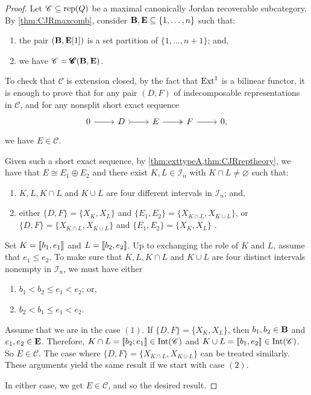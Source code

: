 \begin{proof}
    Let $\mathscr{C} \subseteq \operatorname{rep}(Q)$ be a maximal canonically Jordan recoverable subcategory. By \cref{thm:CJRmaxcomb}, consider $\mathbf B,\mathbf E \subseteq \{1, \ldots,n\}$ such that:
    \begin{enumerate}[label=$\bullet$,itemsep=1mm]
        \item the pair $(\mathbf B,\mathbf E[1])$ is a set partition of $\{1,\ldots,n+1\}$; and, 
        \item we have $\mathscr{C} = \operatorname{\pmb{\mathscr{C}}}(\mathbf B,\mathbf E)$.
    \end{enumerate} To check that $\mathscr{C}$ is extension closed, by the fact that $\operatorname{Ext}^1$ is a bilinear functor, it is enough to prove that for any pair $(D,F)$ of indecomposable representations in $\mathscr{C}$, and for any nonsplit short exact sequence \[\begin{tikzcd}
	0 & D & E & F &  0,
	\arrow[from=1-1, to=1-2]
	\arrow[tail, from=1-2, to=1-3]
	\arrow[two heads,from=1-3, to=1-4]
	\arrow[from=1-4, to=1-5]
\end{tikzcd}\] we have $E \in \mathscr{C}$. 
    
    Given such a short exact sequence, by \cref{thm:exttypeA,thm:CJRreptheory}, we have that $E \cong E_1 \oplus E_2$ and there exist $K,L \in \mathcal{I}_n$ with $K \cap L \neq \varnothing$ such that:
    \begin{enumerate}[label=$\bullet$,itemsep=1mm]
    \item $K,L,K \cap L$ and $K \cup L$ are four different intervals in $\mathcal{I}_n$; and,
    \item either $\{D,F\} = \{X_K, X_L\}$ and $\{E_1,E_2\} = \{X_{K\cap L}, X_{K \cup L} \}$, or \\
    $\{D,F\} = \{X_{K \cap L}, X_{K \cup L}\}$ and $\{E_1,E_2\} = \{X_{K}, X_{L} \}$ .
    \end{enumerate}

    Set $K = \llbracket b_1, e_1 \rrbracket$ and $L = \llbracket b_2,e_2 \rrbracket$. Up to exchanging the role of $K$ and $L$, assume that $e_1 \leqslant e_2$. To make sure that $K,L,K \cap L$ and $K \cup L$ are four distinct intervals nonempty in $\mathcal{I}_n$, we must have either
    \begin{enumerate}[label=$(\arabic*)$, itemsep=1mm]
        \item $b_1 < b_2 \leqslant e_1 < e_2$; or,
        \item  $b_2 < b_1 \leqslant e_1 < e_2$.
    \end{enumerate}
    Assume that we are in the case $(1)$. If $\{D,F\} =\{X_K, X_L\}$, then $b_1,b_2 \in \mathbf B$ and $e_1,e_2 \in \mathbf E$. Therefore, $K \cap L = \llbracket b_2;e_1 \rrbracket \in \operatorname{Int}(\mathscr{C})$ and $K \cup L = \llbracket b_1, e_2 \rrbracket \in \operatorname{Int}(\mathscr{C})$. So $E \in \mathscr{C}$. The case where $\{D,F\} = \{X_{K\cap L},X_{K \cup L}\}$ can be treated similarly. These arguments yield the same result if we start with case $(2)$. 

    In either case, we get $E \in \mathscr{C}$, and so the desired result.
\end{proof}


